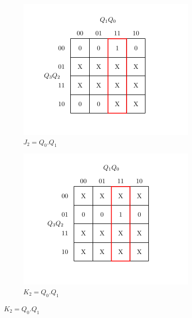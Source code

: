\documentclass[a4paper,12pt]{article}
\begin{document}
\newpage
\begin{figure}[H]
    \centering

    \begin{subfigure}[b]{0.45\textwidth}
        \centering
        \includegraphics[width=\linewidth]{inc/ij2.png}
        \caption{$J_2=Q_0.Q_1$}
    \end{subfigure}
    \hfill
    \begin{subfigure}[b]{0.45\textwidth}
        \centering
        \includegraphics[width=\linewidth]{inc/ik2.png}
        \caption{$K_2=Q_0.Q_1$}
    \end{subfigure}


\end{figure}
\end{document}
